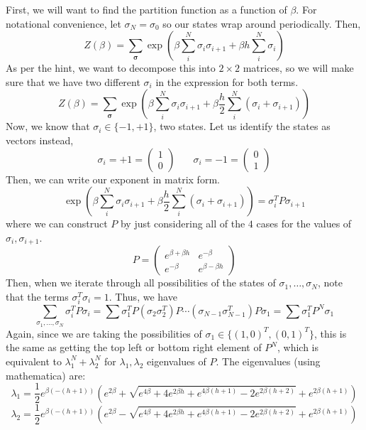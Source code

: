 \documentclass[11pt]{article}
\theoremstyle{definition}
\begin{document}
First, we will want to find the partition function as a function of $\beta$. For notational convenience, let $\sigma_N =\sigma_0$ so our states wrap around periodically. Then,
\[Z(\beta) = 
\sum_{\mathbf{\sigma}} \exp\left(\beta\sum_i^N \sigma_i \sigma_{i+1} + \beta h\sum_i^N\sigma_i \right)\]
As per the hint, we want to decompose this into $2 \times 2$ matrices, so we will make sure that we have two different $\sigma_i$ in the expression for both terms.
\[Z(\beta) = 
\sum_{\mathbf{\sigma}} \exp\left(\beta\sum_i^N \sigma_i \sigma_{i+1} + \beta \frac{h}{2}\sum_i^N (\sigma_i + \sigma_{i+1}) \right)\]
Now, we know that $\sigma_i \in \{-1, +1\}$, two states. Let us identify the states as vectors instead,
\[
	\sigma_i = +1 = \begin{pmatrix} 1 \\ 0 \end{pmatrix}
	~ ~ ~ ~ ~ ~ ~ ~
	\sigma_i = -1 = \begin{pmatrix} 0 \\ 1 \end{pmatrix}
\]
Then, we can write our exponent in matrix form.
\[ \exp\left(\beta\sum_i^N \sigma_i \sigma_{i+1} + \beta \frac{h}{2}\sum_i^N (\sigma_i + \sigma_{i+1}) \right) = \sigma_i^T P \sigma_{i+1}\]
where we can construct $P$ by just considering all of the $4$ cases for the values of $\sigma_i, \sigma_{i+1}$. 
\[ P = 
	\begin{pmatrix}
		e^{\beta + \beta h} & e^{-\beta} \\
		e^{-\beta} & e^{\beta - \beta h}
	\end{pmatrix}
\]
Then, when we iterate through all possibilities of the states of $\sigma_1, \dots, \sigma_N$, note that the terms $\sigma_i^T \sigma_i = 1$. Thus, we have
\[  \sum_{\sigma_1, \dots, \sigma_N} \sigma_i^T P \sigma_i = \sum \sigma_1^T P (\sigma_2\sigma_2^T) P \cdots (\sigma_{N-1} \sigma_{N-1}^T) P \sigma_1 = \sum \sigma_1^T P^N \sigma_1 \]
Again, since we are taking the possibilities of $\sigma_1 \in \{ (1, 0)^T, (0, 1)^T\}$, this is the same as getting the top left or bottom right element of $P^N$, which is equivalent to $\lambda_1^N + \lambda_2^N$ for $\lambda_1, \lambda_2$ eigenvalues of $P$. The eigenvalues (using mathematica) are:
\[ \lambda_1 =\frac{1}{2} e^{\beta  (-(h+1))} \left(e^{2 \beta }+\sqrt{e^{4 \beta }+4 e^{2 \beta  h}+e^{4 \beta  (h+1)}-2 e^{2 \beta  (h+2)}}+e^{2 \beta  (h+1)}\right) \]
\[ \lambda_2 =\frac{1}{2} e^{\beta  (-(h+1))} \left(e^{2 \beta }-\sqrt{e^{4 \beta }+4 e^{2 \beta  h}+e^{4 \beta  (h+1)}-2 e^{2 \beta  (h+2)}}+e^{2 \beta  (h+1)}\right) \]
\end{document}
